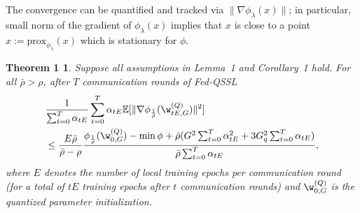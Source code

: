 \documentclass[a4paper,11pt]{article}
\begin{document}
The convergence can be quantified and tracked via $\|\nabla \phi_{\lambda}(x) \|$; in particular, small norm of the gradient of $\phi_{\lambda}(x) $ implies that $x$ is close to a point $\hat{x} := \mathrm{prox}_{\phi_{\lambda}}(x)$ which is stationary for $\phi$. 

\newtheorem*{theorem1}{Theorem 1}
\begin{theorem1}
Suppose all assumptions in Lemma~1 and Corollary~1 hold.
For all $\bar{\rho} > \rho$, after $T$ communication rounds of Fed-QSSL
\begin{align*}
    & \frac{1}{\sum_{t=0}^T \alpha_{tE}} \sum_{t=0}^T \alpha_{tE} \mathbb{E} [ \|\nabla \phi_{\frac{1}{\bar{\rho}}} (\w^{(Q)}_{tE, G}) \|^2 ] \\ & \leq \frac{E \bar{\rho}}{\bar{\rho} - \rho} \frac{ \phi_{\frac{1}{\bar{\rho}}}(\w^{(Q)}_{0, G}) - \min \phi +  \bar{\rho}(G^2\sum_{t=0}^T \alpha^2_{tE}+3G_q^2\sum_{t=0}^T \alpha_{tE})}{\bar{\rho}\sum_{t=0}^T \alpha_{tE} },
\end{align*}
where $E$ denotes the number of local training epochs per communication round (for a total of $tE$ training epochs after $t$ communication rounds) and $\w^{(Q)}_{0, G}$ is the quantized parameter initialization. 
\end{theorem1}
\end{document}
